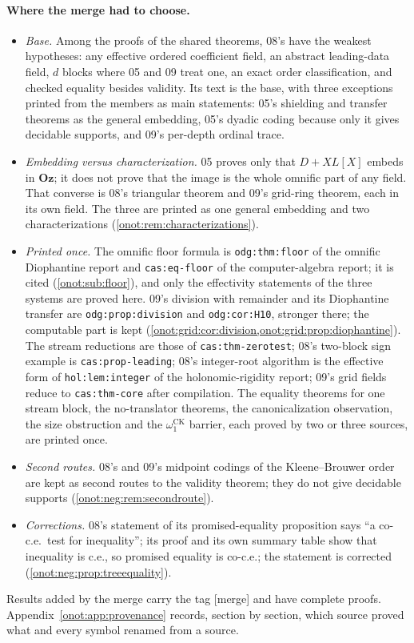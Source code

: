 \documentclass[11pt,oneside]{article}
\numberwithin{equation}{section}
\theoremstyle{definition}
\theoremstyle{remark}
\newcommand{\Oz}{\mathbf{Oz}}
\newcommand{\CK}{\omega_1^{\mathrm{CK}}}
\newcommand{\mergetag}{\textup{\textsf{\small[merge]}}}
\newcommand{\replabel}[1]{\nolinkurl{#1}}
\begin{document}
\paragraph{Where the merge had to choose.}
\begin{itemize}[leftmargin=*]
\item \emph{Base.} Among the proofs of the shared theorems, 08's have the
weakest hypotheses: any effective ordered coefficient field, an abstract
leading-data field, $d$ blocks where 05 and 09 treat one, an exact order
classification, and checked equality besides validity. Its text is the base,
with three exceptions printed from the members as main statements: 05's
shielding and transfer theorems as the general embedding, 05's dyadic coding
because only it gives decidable supports, and 09's per-depth ordinal trace.
\item \emph{Embedding versus characterization.} 05 proves only that $D+XL[X]$
embeds in $\Oz$; it does not prove that the image is the whole omnific part of
any field. That converse is 08's triangular theorem and 09's grid-ring theorem,
each in its own field. The three are printed as one general embedding and two
characterizations (\cref{onot:rem:characterizations}).
\item \emph{Printed once.} The omnific floor formula is
\replabel{odg:thm:floor} of the omnific Diophantine report and
\replabel{cas:eq-floor} of the computer-algebra report; it is cited
(\cref{onot:sub:floor}), and only the effectivity statements of the three
systems are proved here. 09's division with remainder and its Diophantine
transfer are \replabel{odg:prop:division} and \replabel{odg:cor:H10}, stronger
there; the computable part is kept (\cref{onot:grid:cor:division,onot:grid:prop:diophantine}).
The stream reductions are those of \replabel{cas:thm-zerotest}; 08's two-block
sign example is \replabel{cas:prop-leading}; 08's integer-root algorithm is the
effective form of \replabel{hol:lem:integer} of the holonomic-rigidity report;
09's grid fields reduce to \replabel{cas:thm-core} after compilation. The
equality theorems for one stream block, the no-translator theorems, the
canonicalization observation, the size obstruction and the $\CK$ barrier, each
proved by two or three sources, are printed once.
\item \emph{Second routes.} 08's and 09's midpoint codings of the
Kleene--Brouwer order are kept as second routes to the validity theorem; they
do not give decidable supports (\cref{onot:neg:rem:secondroute}).
\item \emph{Corrections.} 08's statement of its promised-equality proposition
says ``a co-c.e.\ test for inequality''; its proof and its own summary table
show that inequality is c.e., so promised equality is co-c.e.; the statement is
corrected (\cref{onot:neg:prop:treeequality}).
\end{itemize}
Results added by the merge carry the tag \mergetag{} and have complete proofs.
Appendix~\ref{onot:app:provenance} records, section by section, which source
proved what and every symbol renamed from a source.
\end{document}
